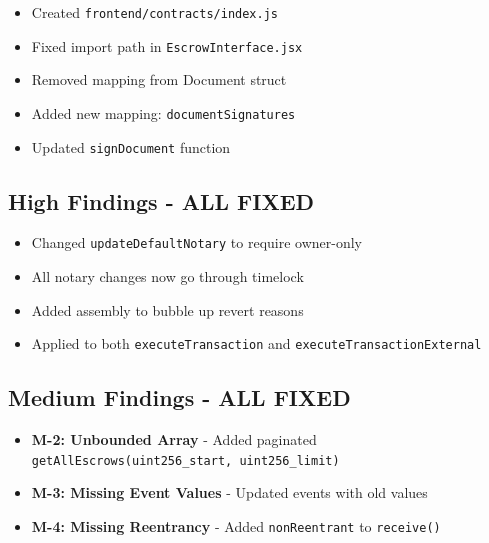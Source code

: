 \documentclass[12pt,a4paper]{article}
\begin{document}
\noindent{}
\begin{itemize}
\item Created \texttt{frontend/contracts/index.js}
\item Fixed import path in \texttt{EscrowInterface.jsx}
\end{itemize}

\noindent{}
\begin{itemize}
\item Removed mapping from Document struct
\item Added new mapping: \texttt{documentSignatures}
\item Updated \texttt{signDocument} function
\end{itemize}

\subsection{High Findings - ALL FIXED}

\noindent{}
\begin{itemize}
\item Changed \texttt{updateDefaultNotary} to require owner-only
\item All notary changes now go through timelock
\end{itemize}

\noindent{}
\begin{itemize}
\item Added assembly to bubble up revert reasons
\item Applied to both \texttt{executeTransaction} and \texttt{executeTransactionExternal}
\end{itemize}

\subsection{Medium Findings - ALL FIXED}

\begin{itemize}
\item \textbf{M-2: Unbounded Array} - Added paginated \texttt{getAllEscrows(uint256\_start, uint256\_limit)}
\item \textbf{M-3: Missing Event Values} - Updated events with old values
\item \textbf{M-4: Missing Reentrancy} - Added \texttt{nonReentrant} to \texttt{receive()}
\end{itemize}
\end{document}
